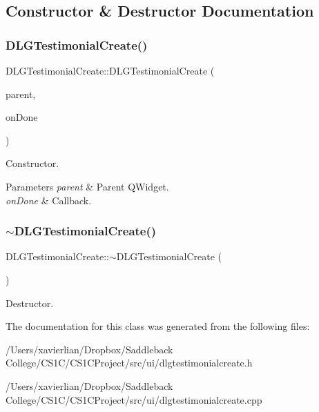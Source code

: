 \subsection{Constructor \& Destructor Documentation}
\mbox{\label{class_d_l_g_testimonial_create_a8273e7c08f467690691ef80452923474}} 
\subsubsection{\texorpdfstring{DLGTestimonialCreate()}{DLGTestimonialCreate()}}
{\footnotesize\ttfamily D\+L\+G\+Testimonial\+Create\+::\+D\+L\+G\+Testimonial\+Create (\begin{DoxyParamCaption}\item[{Q\+Widget $\ast$}]{parent,  }\item[{std\+::function$<$ void()$>$}]{on\+Done }\end{DoxyParamCaption})\hspace{0.3cm}{\ttfamily [explicit]}}



Constructor. 


\begin{DoxyParams}{Parameters}
{\em parent} & Parent Q\+Widget. \\
\hline
{\em on\+Done} & Callback. \\
\hline
\end{DoxyParams}
\mbox{\label{class_d_l_g_testimonial_create_a8dcbb8630fee3de61526f8986bb4d58e}} 
\subsubsection{\texorpdfstring{$\sim$DLGTestimonialCreate()}{~DLGTestimonialCreate()}}
{\footnotesize\ttfamily D\+L\+G\+Testimonial\+Create\+::$\sim$\+D\+L\+G\+Testimonial\+Create (\begin{DoxyParamCaption}{ }\end{DoxyParamCaption})}



Destructor. 



The documentation for this class was generated from the following files\+:\begin{DoxyCompactItemize}
\item 
/\+Users/xavierlian/\+Dropbox/\+Saddleback College/\+C\+S1\+C/\+C\+S1\+C\+Project/src/ui/dlgtestimonialcreate.\+h\item 
/\+Users/xavierlian/\+Dropbox/\+Saddleback College/\+C\+S1\+C/\+C\+S1\+C\+Project/src/ui/dlgtestimonialcreate.\+cpp\end{DoxyCompactItemize}
